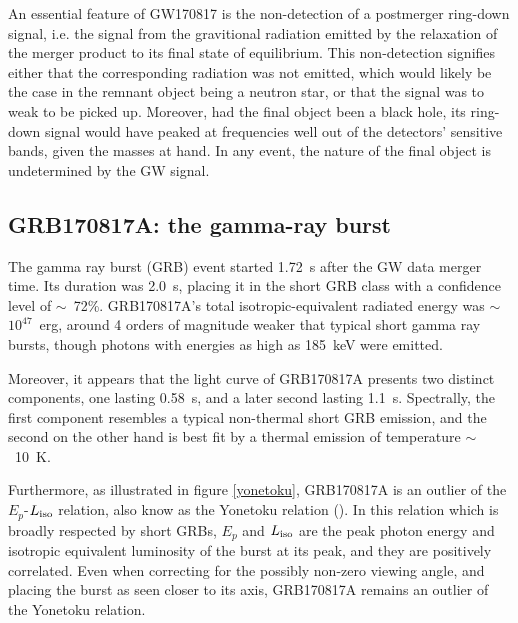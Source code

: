An essential feature of GW170817 is the non-detection of a postmerger ring-down signal, i.e. the signal from the gravitional radiation emitted by the relaxation of the merger product to its final state of equilibrium. This non-detection signifies either that the corresponding radiation was not emitted, which would likely be the case in the remnant object being a neutron star, or that the signal was to weak to be picked up. Moreover, had the final object been a black hole, its ring-down signal would have peaked at frequencies well out of the detectors' sensitive bands, given the masses at hand. In any event, the nature of the final object is undetermined by the GW signal.


\subsection{GRB170817A: the gamma-ray burst}
The gamma ray burst (GRB) event started 1.72~s after the GW data merger time. Its duration was 2.0~s, placing it in the short GRB class with a confidence level of $\sim$~72\%. GRB170817A's total isotropic-equivalent radiated energy was $\sim$~$10^{47}$~erg, around 4 orders of magnitude weaker that typical short gamma ray bursts, though photons with energies as high as 185~keV were emitted.

Moreover, it appears that the light curve of GRB170817A presents two distinct components, one lasting 0.58~s, and a later second lasting 1.1~s. Spectrally, the first component resembles a typical non-thermal short GRB emission, and the second on the other hand is best fit by a thermal emission of temperature $\sim$~10~K.

Furthermore, as illustrated in figure \ref{yonetoku}, GRB170817A is an outlier of the $E_p$-$L_{\rm{iso}}$ relation, also know as the Yonetoku relation (\cite{35}). In this relation which is broadly respected by short GRBs, $E_p$  and $L_{\rm{iso}}$ are the peak photon energy and isotropic equivalent luminosity of the burst at its peak, and they are positively correlated. Even when correcting for the possibly non-zero viewing angle, and placing the burst as seen closer to its axis, GRB170817A remains an outlier of the Yonetoku relation.


